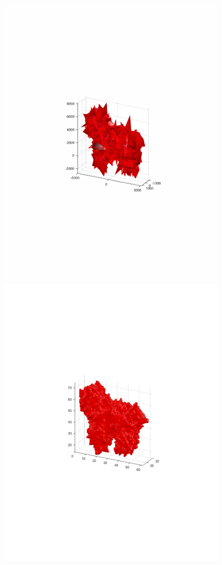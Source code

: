 \documentclass{UCF_ETD}
\begin{document}
\begin{figure}[H]
\begin{center}
\includegraphics[scale=0.5]{RobustRegistration/NoisyDog}
\includegraphics[scale=0.5]{RobustRegistration/VoxelizedNoisyOriginalDog}

\end{center}
\end{figure}
\end{document}
